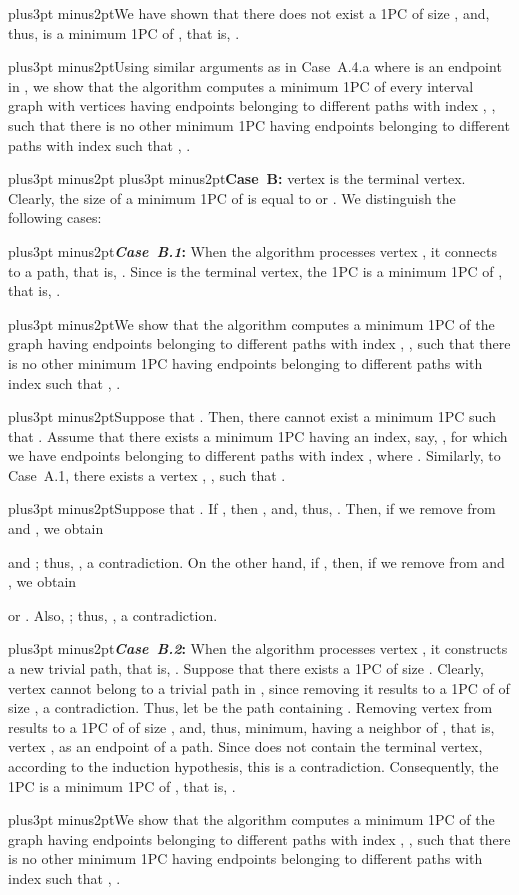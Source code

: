 \documentclass[10pt]{article}
\def\yskip{\penalty-50\vskip3pt plus3pt minus2pt}
\def\y{\yskip}
\def\yy{\yskip\yskip}
\begin{document}
{\y We have shown that there does not exist a 1PC
 of size
, and, thus,
 is a minimum 1PC of , that is,
.

\y Using similar arguments as in Case~A.4.a where  is an
endpoint in , we show that the
algorithm computes a minimum 1PC  of
every interval graph  with  vertices having
 endpoints  belonging to different
paths with index , , such that
there is no other minimum 1PC 
having  endpoints  belonging to
different paths with index  such that
, .

\yy {\bf Case~B:} vertex  is the terminal vertex. Clearly,
the size  of a minimum 1PC of  is
equal to  or
. We distinguish the following cases:

\y {\bf \textit{Case~B.1}:} When the algorithm processes vertex
, it connects  to a path, that is,
. Since  is
the terminal vertex, the 1PC  is a
minimum 1PC of , that is,
.

\y We show that the algorithm computes a minimum 1PC
 of the graph  having
 endpoints  belonging to different
paths with index , , such that
there is no other minimum 1PC 
having  endpoints  belonging to
different paths with index  such that
, .

\y Suppose that . Then, there cannot exist a minimum
1PC  such that .
Assume that there exists a minimum 1PC
 having an index, say, , for
which we have  endpoints 
belonging to different paths with index ,
where .
Similarly, to Case~A.1, there exists a vertex , , such that .

\y Suppose that . If , then
, and, thus, . Then, if we
remove  from  and
, we obtain

and ; thus,
, a
contradiction. On the other hand, if , then, if we
remove  from  and
, we obtain

or
.
Also, ; thus,
, a
contradiction.

\y {\bf \textit{Case~B.2}:} When the algorithm processes vertex
, it constructs a new trivial path, that is,
. Suppose that
there exists a 1PC  of size
. Clearly, vertex  cannot belong
to a trivial path in , since
removing it results to a 1PC of  of size
, a contradiction. Thus, let  be the path
containing . Removing vertex  from
 results to a 1PC of  of size
, and, thus, minimum, having a neighbor
of , that is, vertex , as an endpoint of a path. Since
 does not contain the terminal vertex, according to the
induction hypothesis, this is a contradiction. Consequently, the
1PC  is a minimum 1PC of , that
is,
.


\y We show that the algorithm computes a minimum 1PC
 of the graph  having
 endpoints  belonging to different
paths with index , , such that
there is no other minimum 1PC 
having  endpoints  belonging to
different paths with index  such that
, .

}
\end{document}
